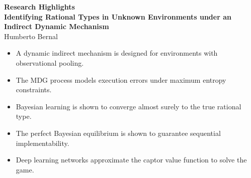 \documentclass[12pt]{article}
\begin{document}
\doublespacing

\begin{center}
\textbf{Research Highlights} \\
\vspace{1em}
\textbf{Identifying Rational Types in Unknown Environments under an Indirect Dynamic Mechanism} \\
Humberto Bernal
\end{center}

\vspace{2em}

\begin{itemize}
    \item A dynamic indirect mechanism is designed for environments with observational pooling.
    \item The MDG process models execution errors under maximum entropy constraints.
    \item Bayesian learning is shown to converge almost surely to the true rational type.
    \item The perfect Bayesian equilibrium is shown to guarantee sequential implementability.
    \item Deep learning networks approximate the captor value function to solve the game.
\end{itemize}
\end{document}
